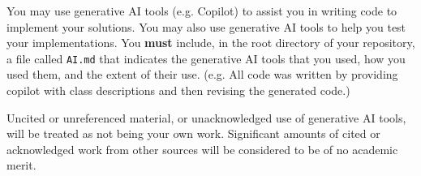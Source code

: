 \documentclass{csse4400}
\begin{document}
You may use generative AI tools (e.g. Copilot) to assist you in writing code to implement your solutions.
You may also use generative AI tools to help you test your implementations.
You \textbf{must} include, in the root directory of your repository,
a file called \texttt{AI.md} that indicates the generative AI tools that you used,
how you used them, and the extent of their use.
(e.g. All code was written by providing copilot with class descriptions and then revising the generated code.)

Uncited or unreferenced material, or unacknowledged use of generative AI tools,
will be treated as not being your own work.
Significant amounts of cited or acknowledged work from other sources
will be considered to be of no academic merit.







\end{document}

